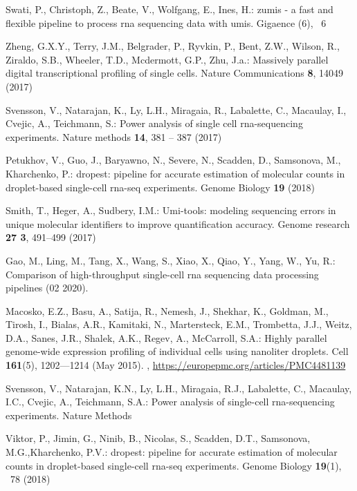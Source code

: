 \documentclass[runningheads]{llncs}
\begin{document}
\begin{thebibliography}{8}
Swati, P., Christoph, Z., Beate, V., Wolfgang, E., Ines, H.: zumis - a fast and
flexible pipeline to process rna sequencing data with umis. Gigaence (6), ~6

Zheng, G.X.Y., Terry, J.M., Belgrader, P., Ryvkin, P., Bent, Z.W., Wilson, R.,
Ziraldo, S.B., Wheeler, T.D., Mcdermott, G.P., Zhu, J.a.: Massively parallel
digital transcriptional profiling of single cells. Nature Communications
\textbf{8},  14049 (2017)

Svensson, V., Natarajan, K., Ly, L.H., Miragaia, R., Labalette, C., Macaulay,
I., Cvejic, A., Teichmann, S.: Power analysis of single cell rna-sequencing
experiments. Nature methods  \textbf{14},  381 -- 387 (2017)

Petukhov, V., Guo, J., Baryawno, N., Severe, N., Scadden, D., Samsonova, M.,
Kharchenko, P.: dropest: pipeline for accurate estimation of molecular counts
in droplet-based single-cell rna-seq experiments. Genome Biology  \textbf{19}
(2018)

Smith, T., Heger, A., Sudbery, I.M.: Umi-tools: modeling sequencing errors in
unique molecular identifiers to improve quantification accuracy. Genome
research  \textbf{27 3},  491--499 (2017)

Gao, M., Ling, M., Tang, X., Wang, S., Xiao, X., Qiao, Y., Yang, W., Yu, R.:
Comparison of high-throughput single-cell rna sequencing data processing
pipelines  (02 2020). 

Macosko, E.Z., Basu, A., Satija, R., Nemesh, J., Shekhar, K., Goldman, M.,
Tirosh, I., Bialas, A.R., Kamitaki, N., Martersteck, E.M., Trombetta, J.J.,
Weitz, D.A., Sanes, J.R., Shalek, A.K., Regev, A., McCarroll, S.A.: Highly
parallel genome-wide expression profiling of individual cells using nanoliter
droplets. Cell  \textbf{161}(5),  1202—1214 (May 2015).
,
\url{https://europepmc.org/articles/PMC4481139}

Svensson, V., Natarajan, K.N., Ly, L.H., Miragaia, R.J., Labalette, C.,
Macaulay, I.C., Cvejic, A., Teichmann, S.A.: Power analysis of single-cell
rna-sequencing experiments. Nature Methods

Viktor, P., Jimin, G., Ninib, B., Nicolas, S., Scadden, D.T., Samsonova, M.G.,Kharchenko, P.V.: dropest: pipeline for accurate estimation of molecular
  counts in droplet-based single-cell rna-seq experiments. Genome Biology
\textbf{19}(1), ~78 (2018)


\end{thebibliography}
\end{document}
